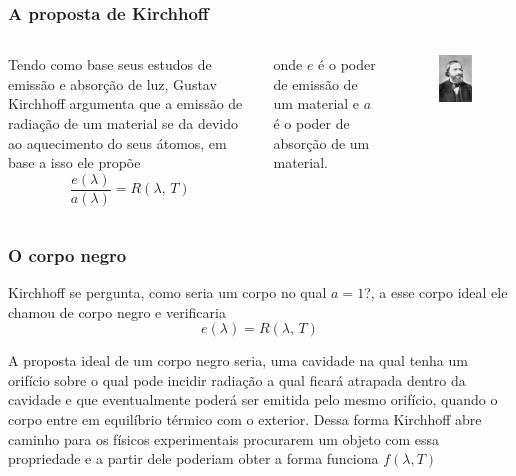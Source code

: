 \documentclass[12pt,brazil]{beamer}
\begin{document}

\begin{frame}
  \frametitle{A proposta de  Kirchhoff}
    \begin{columns}[c]

      \column{6cm}
        \fontsize{12pt}{11pt}\selectfont
        Tendo como base seus estudos de emissão e absorção de luz, Gustav Kirchhoff argumenta que a emissão de radiação de um material se da devido ao aquecimento do seus átomos, em base a isso ele propõe
        \[
         \dfrac{e(\lambda)}{a(\lambda)} = R(\lambda , \, T)
        \]
        
        onde $e$ é o poder de emissão de um material e $a$ é o poder de absorção de um material.

      
      \column{4cm}
        \vspace*{-0.75cm}
        \begin{figure}
          \includegraphics[width=4.5cm]{figuras/fig03}
        \end{figure}
      
    \end{columns}

\end{frame}




\begin{frame}
  \frametitle{O corpo negro}

        \fontsize{12pt}{11pt}\selectfont
        Kirchhoff  se pergunta, como seria um corpo no qual $a=1$?, a esse corpo ideal ele chamou de corpo negro e verificaria
        \[
         e(\lambda) = R(\lambda , \, T)
        \]
        
        A proposta ideal de um corpo negro seria, uma cavidade na qual tenha um orifício sobre o qual pode incidir radiação a qual ficará atrapada dentro da cavidade e que eventualmente poderá ser emitida pelo mesmo orifício, quando o corpo entre em equilíbrio térmico com o exterior.  Dessa forma Kirchhoff abre caminho para os físicos experimentais procurarem um objeto com essa propriedade e a partir dele poderiam obter a forma funciona $f(\lambda, T)$

\end{frame}
\end{document}
